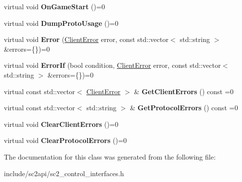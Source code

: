 \begin{DoxyCompactItemize}
virtual void {\bfseries On\+Game\+Start} ()=0
\item 
\mbox{\label{classsc2_1_1_control_interface_aac30977133be8ffe2a749a920149b5d3}} 
virtual void {\bfseries Dump\+Proto\+Usage} ()=0
\item 
\mbox{\label{classsc2_1_1_control_interface_ab3e7b964d0f7e90cc239e5997b09b5c4}} 
virtual void {\bfseries Error} (\hyperlink{sc2__client_8h_ac7d3e3694a208204e099f04c1e5eded0}{Client\+Error} error, const std\+::vector$<$ std\+::string $>$ \&errors=\{\})=0
\item 
\mbox{\label{classsc2_1_1_control_interface_a0f3a503c5e2ed951eed1774866a0280f}} 
virtual void {\bfseries Error\+If} (bool condition, \hyperlink{sc2__client_8h_ac7d3e3694a208204e099f04c1e5eded0}{Client\+Error} error, const std\+::vector$<$ std\+::string $>$ \&errors=\{\})=0
\item 
\mbox{\label{classsc2_1_1_control_interface_ac033fdc8fb4d4aa50a174b6d8870a143}} 
virtual const std\+::vector$<$ \hyperlink{sc2__client_8h_ac7d3e3694a208204e099f04c1e5eded0}{Client\+Error} $>$ \& {\bfseries Get\+Client\+Errors} () const =0
\item 
\mbox{\label{classsc2_1_1_control_interface_ac26497e85a0dc55ae82270f0f50d5f03}} 
virtual const std\+::vector$<$ std\+::string $>$ \& {\bfseries Get\+Protocol\+Errors} () const =0
\item 
\mbox{\label{classsc2_1_1_control_interface_a8873d48c9aea76578115f4d5d1fbdbf5}} 
virtual void {\bfseries Clear\+Client\+Errors} ()=0
\item 
\mbox{\label{classsc2_1_1_control_interface_a0b7042768e8b428f867b9069281e8c66}} 
virtual void {\bfseries Clear\+Protocol\+Errors} ()=0
\end{DoxyCompactItemize}


The documentation for this class was generated from the following file\+:\begin{DoxyCompactItemize}
\item 
include/sc2api/sc2\+\_\+control\+\_\+interfaces.\+h\end{DoxyCompactItemize}
